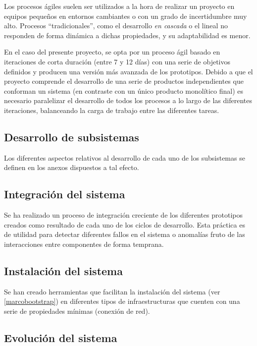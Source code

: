 Los procesos ágiles suelen ser utilizados a la hora de realizar un proyecto en equipos pequeños en entornos cambiantes o con un grado de incertidumbre muy alto. Procesos ``tradicionales'', como el desarrollo \textit{en cascada} o el lineal no responden de forma dinámica a dichas propiedades, y su adaptabilidad es menor.

En el caso del presente proyecto, se opta por un proceso ágil basado en iteraciones de corta duración (entre 7 y 12 días) con una serie de objetivos definidos y producen una versión más avanzada de los prototipos. Debido a que el proyecto comprende el desarrollo de una serie de productos independientes que conforman un sistema (en contraste con un único producto monolítico final) es necesario paralelizar el desarrollo de todos los procesos a lo largo de las diferentes iteraciones, balanceando la carga de trabajo entre las diferentes tareas.

\subsection{Desarrollo de subsistemas}
Los diferentes aspectos relativos al desarrollo de cada uno de los subsistemas se definen en los anexos dispuestos a tal efecto.

\subsection{Integración del sistema}

Se ha realizado un proceso de integración creciente de los diferentes prototipos creados como resultado de cada uno de los ciclos de desarrollo. Esta práctica es de utilidad para detectar diferentes fallos en el sistema o anomalías fruto de las interacciones entre componentes de forma temprana.

\subsection{Instalación del sistema}

Se han creado herramientas que facilitan la instalación del sistema (ver \ref{marcobootstrap}) en diferentes tipos de infraestructuras que cuenten con una serie de propiedades mínimas (conexión de red).
\subsection{Evolución del sistema}

